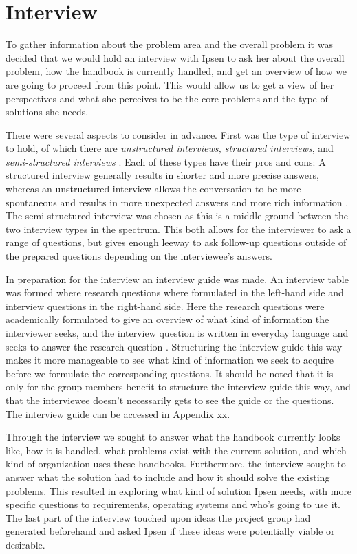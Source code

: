 \chapter{Interview} \label{sec:interview}

To gather information about the problem area and the overall problem it was decided that we would hold an interview with Ipsen to ask her about the overall problem, how the handbook is currently handled, and get an overview of how we are going to proceed from this point.
This would allow us to get a view of her perspectives and what she perceives to be the core problems and the type of solutions she needs.

There were several aspects to consider in advance.
First was the type of interview to hold, of which there are \textit{unstructured interviews, structured interviews}, and \textit{semi-structured interviews} \citep{interactionhci}.
Each of these types have their pros and cons: A structured interview generally results in shorter and more precise answers, whereas an unstructured interview allows the conversation to be more spontaneous and results in more unexpected answers and more rich information \citep{interview}.
The semi-structured interview was chosen as this is a middle ground between the two interview types in the spectrum.
This both allows for the interviewer to ask a range of questions, but gives enough leeway to ask follow-up questions outside of the prepared questions depending on the interviewee’s answers.

In preparation for the interview an interview guide was made.
An interview table was formed where research questions where formulated in the left-hand side and interview questions in the right-hand side.
Here the research questions were academically formulated to give an overview of what kind of information the interviewer seeks, and the interview question is written in everyday language and seeks to answer the research question \citep{interview}.
Structuring the interview guide this way makes it more manageable to see what kind of information we seek to acquire before we formulate the corresponding questions.
It should be noted that it is only for the group members benefit to structure the interview guide this way, and that the interviewee doesn’t necessarily gets to see the guide or the questions.
The interview guide can be accessed in Appendix xx.

Through the interview we sought to answer what the handbook currently looks like, how it is handled, what problems exist with the current solution, and which kind of organization uses these handbooks.
Furthermore, the interview sought to answer what the solution had to include and how it should solve the existing problems.
This resulted in exploring what kind of solution Ipsen needs, with more specific questions to requirements, operating systems and who’s going to use it.
The last part of the interview touched upon ideas the project group had generated beforehand and asked Ipsen if these ideas were potentially viable or desirable.

